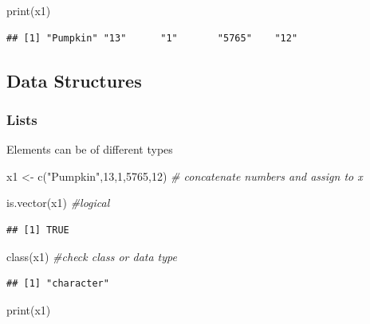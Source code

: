 \documentclass[
]{article}
\newenvironment{Shaded}{\begin{snugshade}}{\end{snugshade}}
\newcommand{\CommentTok}[1]{\textcolor[rgb]{0.56,0.35,0.01}{\textit{#1}}}
\newcommand{\DecValTok}[1]{\textcolor[rgb]{0.00,0.00,0.81}{#1}}
\newcommand{\FunctionTok}[1]{\textcolor[rgb]{0.00,0.00,0.00}{#1}}
\newcommand{\NormalTok}[1]{#1}
\newcommand{\OtherTok}[1]{\textcolor[rgb]{0.56,0.35,0.01}{#1}}
\newcommand{\StringTok}[1]{\textcolor[rgb]{0.31,0.60,0.02}{#1}}
\begin{document}
\begin{Shaded}
\begin{Highlighting}[]
\FunctionTok{print}\NormalTok{(x1)}
\end{Highlighting}
\end{Shaded}

\begin{verbatim}
## [1] "Pumpkin" "13"      "1"       "5765"    "12"
\end{verbatim}

\hypertarget{data-structures-2}{%
\subsection{Data Structures}\label{data-structures-2}}

\hypertarget{lists}{%
\subsubsection{Lists}\label{lists}}

Elements can be of different types

\begin{Shaded}
\begin{Highlighting}[]
\NormalTok{x1 }\OtherTok{\textless{}{-}} \FunctionTok{c}\NormalTok{(}\StringTok{"Pumpkin"}\NormalTok{,}\DecValTok{13}\NormalTok{,}\DecValTok{1}\NormalTok{,}\DecValTok{5765}\NormalTok{,}\DecValTok{12}\NormalTok{) }\CommentTok{\# concatenate numbers and assign to x}

\FunctionTok{is.vector}\NormalTok{(x1) }\CommentTok{\#logical}
\end{Highlighting}
\end{Shaded}

\begin{verbatim}
## [1] TRUE
\end{verbatim}

\begin{Shaded}
\begin{Highlighting}[]
\FunctionTok{class}\NormalTok{(x1) }\CommentTok{\#check class or data type}
\end{Highlighting}
\end{Shaded}

\begin{verbatim}
## [1] "character"
\end{verbatim}

\begin{Shaded}
\begin{Highlighting}[]
\FunctionTok{print}\NormalTok{(x1)}
\end{Highlighting}
\end{Shaded}
\end{document}

